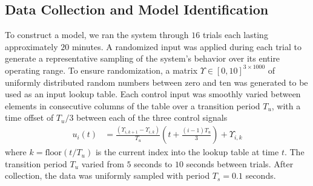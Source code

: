 \subsection{Data Collection and Model Identification}
\label{sec:datacollection}

To construct a model, we ran the system through $16$ trials each lasting approximately $20$ minutes.
A randomized input was applied during each trial to generate a representative sampling of the system's behavior over its entire operating range.
To ensure randomization, a matrix $\Upsilon \in [0,10]^{3\times 1000}$ of uniformly distributed random numbers between zero and ten was generated to be used as an input lookup table.
Each control input was smoothly varied between elements in consecutive columns of the table over a transition period $T_u$, with a time offset of $T_u / 3$ between each of the three control signals
\begin{align}
    u_i (t) &= \frac{(\Upsilon_{i,k+1} - \Upsilon_{i,k})}{T_u} \left( t + \frac{(i-1) T_u}{3} \right) + \Upsilon_{i,k}
    \label{eq:input}
\end{align}
where $k = \text{floor}\left( {t} / {T_u} \right)$ is the current index into the lookup table at time $t$. 
The transition period $T_u$ varied from $5$ seconds to $10$ seconds between trials.
After collection, the data was uniformly sampled with period $T_s = 0.1$ seconds.

